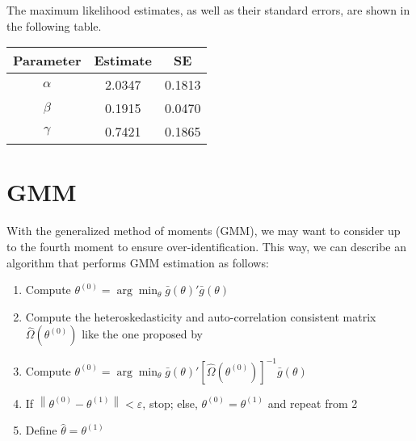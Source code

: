\documentclass[cm,linguex]{glossa}
\providecommand{\tightlist}{%
  \setlength{\itemsep}{0pt}\setlength{\parskip}{0pt}}
\begin{document}
The maximum likelihood estimates, as well as their standard errors, are
shown in the following table.

\begin{longtable}[]{@{}ccc@{}}
\toprule()
Parameter & Estimate & SE \\
\midrule()
\endhead
\(\alpha\) & 2.0347 & 0.1813 \\
\(\beta\) & 0.1915 & 0.0470 \\
\(\gamma\) & 0.7421 & 0.1865 \\
\bottomrule()
\end{longtable}

\newpage

\hypertarget{gmm}{%
\section{GMM}\label{gmm}}

With the generalized method of moments (GMM), we may want to consider up
to the fourth moment to ensure over-identification. This way, we can
describe an algorithm that performs GMM estimation as follows:

\begin{enumerate}
\def\labelenumi{\arabic{enumi}.}
\tightlist
\item
  Compute
  \(\theta^{(0)} = \arg\min_\theta \bar{g}(\theta)'\bar{g}(\theta)\)
\item
  Compute the heteroskedasticity and auto-correlation consistent matrix
  \(\hat{\Omega} \left(\theta^{(0)}\right)\) like the one proposed by
  \citet{HAC}
\item
  Compute
  \(\theta^{(0)} = \arg\min_\theta \bar{g}(\theta)'\left[\hat{\Omega} \left(\theta^{(0)}\right)\right]^{-1}\bar{g}(\theta)\)
\item
  If
  \(\left\lVert \theta^{(0)} - \theta^{(1)} \right\rVert < \varepsilon\),
  stop; else, \(\theta^{(0)} = \theta^{(1)}\) and repeat from 2
\item
  Define \(\hat{\theta} = \theta^{(1)}\)
\end{enumerate}

\newpage


\end{document}
